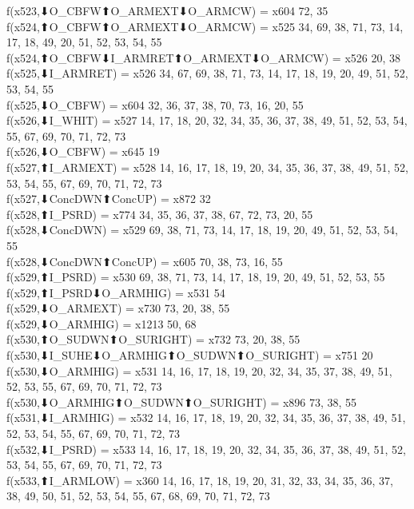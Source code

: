 f(x523,⬇O_CBFW⬆O_ARMEXT⬇O_ARMCW) = x604 {72, 35} \\
f(x524,⬆O_CBFW⬆O_ARMEXT⬇O_ARMCW) = x525 {34, 69, 38, 71, 73, 14, 17, 18, 49, 20, 51, 52, 53, 54, 55} \\
f(x524,⬆O_CBFW⬇I_ARMRET⬆O_ARMEXT⬇O_ARMCW) = x526 {20, 38} \\
f(x525,⬇I_ARMRET) = x526 {34, 67, 69, 38, 71, 73, 14, 17, 18, 19, 20, 49, 51, 52, 53, 54, 55} \\
f(x525,⬇O_CBFW) = x604 {32, 36, 37, 38, 70, 73, 16, 20, 55} \\
f(x526,⬇I_WHIT) = x527 {14, 17, 18, 20, 32, 34, 35, 36, 37, 38, 49, 51, 52, 53, 54, 55, 67, 69, 70, 71, 72, 73} \\
f(x526,⬇O_CBFW) = x645 {19} \\
f(x527,⬆I_ARMEXT) = x528 {14, 16, 17, 18, 19, 20, 34, 35, 36, 37, 38, 49, 51, 52, 53, 54, 55, 67, 69, 70, 71, 72, 73} \\
f(x527,⬇ConcDWN⬆ConcUP) = x872 {32} \\
f(x528,⬆I_PSRD) = x774 {34, 35, 36, 37, 38, 67, 72, 73, 20, 55} \\
f(x528,⬇ConcDWN) = x529 {69, 38, 71, 73, 14, 17, 18, 19, 20, 49, 51, 52, 53, 54, 55} \\
f(x528,⬇ConcDWN⬆ConcUP) = x605 {70, 38, 73, 16, 55} \\
f(x529,⬆I_PSRD) = x530 {69, 38, 71, 73, 14, 17, 18, 19, 20, 49, 51, 52, 53, 55} \\
f(x529,⬆I_PSRD⬇O_ARMHIG) = x531 {54} \\
f(x529,⬇O_ARMEXT) = x730 {73, 20, 38, 55} \\
f(x529,⬇O_ARMHIG) = x1213 {50, 68} \\
f(x530,⬆O_SUDWN⬆O_SURIGHT) = x732 {73, 20, 38, 55} \\
f(x530,⬇I_SUHE⬇O_ARMHIG⬆O_SUDWN⬆O_SURIGHT) = x751 {20} \\
f(x530,⬇O_ARMHIG) = x531 {14, 16, 17, 18, 19, 20, 32, 34, 35, 37, 38, 49, 51, 52, 53, 55, 67, 69, 70, 71, 72, 73} \\
f(x530,⬇O_ARMHIG⬆O_SUDWN⬆O_SURIGHT) = x896 {73, 38, 55} \\
f(x531,⬇I_ARMHIG) = x532 {14, 16, 17, 18, 19, 20, 32, 34, 35, 36, 37, 38, 49, 51, 52, 53, 54, 55, 67, 69, 70, 71, 72, 73} \\
f(x532,⬇I_PSRD) = x533 {14, 16, 17, 18, 19, 20, 32, 34, 35, 36, 37, 38, 49, 51, 52, 53, 54, 55, 67, 69, 70, 71, 72, 73} \\
f(x533,⬆I_ARMLOW) = x360 {14, 16, 17, 18, 19, 20, 31, 32, 33, 34, 35, 36, 37, 38, 49, 50, 51, 52, 53, 54, 55, 67, 68, 69, 70, 71, 72, 73} \\
